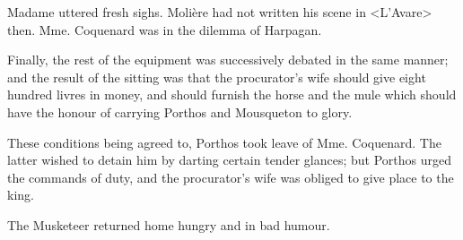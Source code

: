 Madame uttered fresh sighs. Molière had not written his scene in <L'Avare> then. Mme. Coquenard was in the dilemma of Harpagan. 

Finally, the rest of the equipment was successively debated in the same manner; and the result of the sitting was that the procurator's wife should give eight hundred livres in money, and should furnish the horse and the mule which should have the honour of carrying Porthos and Mousqueton to glory. 

These conditions being agreed to, Porthos took leave of Mme. Coquenard. The latter wished to detain him by darting certain tender glances; but Porthos urged the commands of duty, and the procurator's wife was obliged to give place to the king. 

The Musketeer returned home hungry and in bad humour. 
